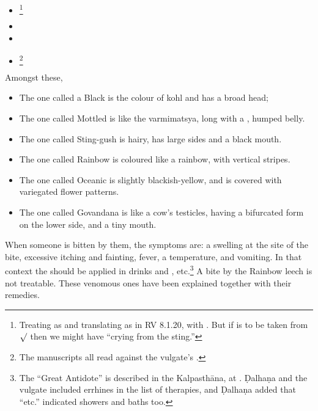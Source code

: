 \begin{translation}
\begin{itemize}
    \item {}\footnote{Treating  as
     and translating as in RV 8.1.20, with \citet[1023, verse 20
    and cf.\ commentary]{jami-2014}. But if  is to be taken from
    $\surd$ then we might have “crying from the sting.”}
    
    \item {} 
    
    \item {} \item
{}\footnote{The manuscripts all read
     against the vulgate's .}
\end{itemize}
Amongst these, 
\begin{itemize}
    \item The one called a Black is the colour of kohl and has a broad head;

    \item The one called Mottled is like the \gls{varmimatsya}, long with a
, humped belly.
    
    \item  The one called Sting-gush is hairy, has large sides and a black mouth.
    
    \item  The one called Rainbow is coloured like a rainbow, with vertical stripes.
    
    \item  The one called Oceanic is slightly blackish-yellow, and is covered with
    variegated flower patterns. 
    
    \item The one called Govandana is like a cow's testicles, having a bifurcated form 
    on the lower side, and a tiny mouth. 
       
\end{itemize}
When someone is bitten by them, the symptoms are: a swelling at the site of
the bite, excessive itching and fainting, fever, a temperature, and
vomiting. In that context the  should be
applied in drinks and , etc.\footnote{The “Great Antidote” is
    described in the Kalpasthāna, at .  Ḍalhaṇa and the 
    vulgate included errhines in the list of therapies, and Ḍalhaṇa added that “etc.” 
    indicated showers and baths too.} A bite by the
    Rainbow leech is not treatable.  These venomous ones have been explained
    together with their remedies.


\end{translation}
